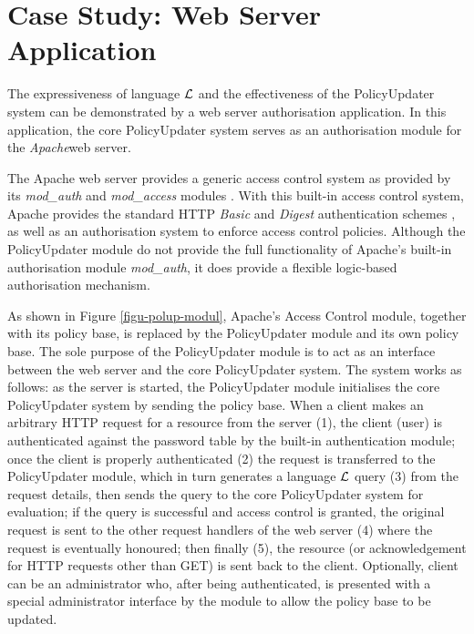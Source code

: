 \documentclass[11pt]{report}
\begin{document}
    \section{Case Study: Web Server Application}
      \label{sect-polup-cases}

      The expressiveness of language $\cal{L}$ and the effectiveness of the
      PolicyUpdater system can be demonstrated by a web server authorisation
      application. In this application, the core PolicyUpdater system serves as
      an authorisation module for the {\em Apache}\footnotemark web server.


      The Apache web server provides a generic access control system as
      provided by its {\em mod\_auth} and {\em mod\_access} modules
      \cite{AP,LAU}. With this built-in access control system, Apache provides
      the standard HTTP {\em Basic} and {\em Digest} authentication schemes
      \cite{HTTP2}, as well as an authorisation system to enforce access
      control policies. Although the PolicyUpdater module do not provide the
      full functionality of Apache's built-in authorisation module
      {\em mod\_auth}, it does provide a flexible logic-based authorisation
      mechanism.

      As shown in Figure \ref{figu-polup-modul}, Apache's Access Control
      module, together with its policy base, is replaced by the PolicyUpdater
      module and its own policy base. The sole purpose of the PolicyUpdater
      module is to act as an interface between the web server and the core
      PolicyUpdater system. The system works as follows: as the server is
      started, the PolicyUpdater module initialises the core PolicyUpdater
      system by sending the policy base. When a client makes an arbitrary
      HTTP request for a resource from the server (1), the client (user) is
      authenticated against the password table by the built-in authentication
      module; once the client is properly authenticated (2) the request is
      transferred to the PolicyUpdater module, which in turn generates a
      language ${\cal L}$ query (3) from the request details, then sends the
      query to the core PolicyUpdater system for evaluation; if the query is
      successful and access control is granted, the original request is sent to
      the other request handlers of the web server (4) where the request is
      eventually honoured; then finally (5), the resource (or acknowledgement
      for HTTP requests other than GET) is sent back to the client. Optionally,
      client can be an administrator who, after being authenticated, is
      presented with a special administrator interface by the module to allow
      the policy base to be updated.
\end{document}
